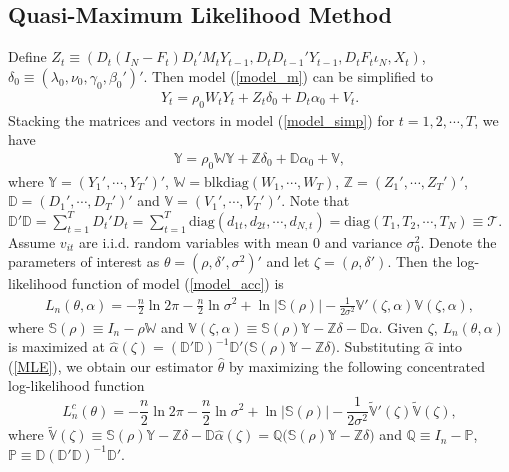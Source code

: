 \documentclass[11pt,a4paper]{article}
\begin{document}
\subsection{Quasi-Maximum Likelihood Method}
Define $Z_t\equiv(D_t(I_N-F_t)D_t'M_tY_{t-1},D_tD_{t-1}'Y_{t-1},D_tF_t\iota_N,X_t)$, $\delta_0\equiv(\lambda_0,\nu_0,\gamma_0,\beta_0')'$.
Then model (\ref{model_m}) can be simplified to
\begin{align}\label{model_simp}
Y_t=\rho_0 W_tY_t+ Z_t\delta_0+D_t\alpha_0+V_t.
\end{align}
Stacking the matrices and vectors in model (\ref{model_simp}) for $t=1,2,\cdots,T$, we have 
\begin{align}\label{model_acc}
\mathbb{Y}=\rho_0\mathbb{W}\mathbb{Y}+\mathbb{Z}\delta_0+\mathbb{D}\alpha_0+\mathbb{V},
\end{align}
where $\mathbb{Y}=(Y_1',\cdots,Y_T')'$, $\mathbb{W}=\mathrm{blkdiag}(W_1,\cdots,W_T)$, $\mathbb{Z}=(Z_1',\cdots,Z_T')'$, $\mathbb{D}=(D_1',\cdots,D_T')'$ and $\mathbb{V}=(V_1',\cdots,V_T')'$.
Note that $\mathbb{D'D}=\sum_{t=1}^TD_t'D_t=\sum_{t=1}^T\mathrm{diag}(d_{1t},d_{2t},\cdots,d_{N,t})=\mathrm{diag}(T_1,T_2,\cdots,T_N)\equiv\mathcal{T}$.
Assume $v_{it}$ are i.i.d. random variables with mean $0$ and variance $\sigma^2_0$. Denote the parameters of interest as $\theta=(\rho,\delta',\sigma^2)'$ and let $\zeta=(\rho,\delta')$. Then the log-likelihood function of model (\ref{model_acc}) is
\begin{align}\label{MLE}
L_n(\theta,\alpha)=-\frac{n}{2}\ln2\pi-\frac{n}{2}\ln\sigma^2+\ln|\mathbb{S}(\rho)|-\frac{1}{2\sigma^2}\mathbb{V}'(\zeta,\alpha)\mathbb{V}(\zeta,\alpha),
\end{align}
where $\mathbb{S}(\rho)\equiv I_{n}-\rho\mathbb{W}$ and $\mathbb{V}(\zeta,\alpha)\equiv\mathbb{S(\rho)Y-Z}\delta-\mathbb{D}\alpha$. Given $\zeta$, $L_n(\theta,\alpha)$ is maximized at
$\hat{\alpha}(\zeta)=\mathbb{(D'D)}^{-1} \mathbb{D'}(\mathbb{S}(\rho)\mathbb{Y-Z\delta)}$.
Substituting $\hat{\alpha}$ into (\ref{MLE}), we obtain our 
estimator $\hat{\theta}$ by maximizing the following concentrated log-likelihood function
\begin{equation}
L_n^c(\theta)=-\frac{n}{2}\ln2\pi-\frac{n}{2}\ln\sigma^2+\ln|\mathbb{S}(\rho)|-\frac{1}{2\sigma^2}\widetilde{\mathbb{V}}'(\zeta)\widetilde{\mathbb{V}}(\zeta),\label{CMLE}
\end{equation}
where $\widetilde{\mathbb{V}}(\zeta)\equiv\mathbb{S}(\rho)\mathbb{Y-Z\delta}-\mathbb{D}\hat{\alpha}(\zeta)=\mathbb{Q(S(\rho)Y-Z\delta})$ and $\mathbb{Q}\equiv I_{n}-\mathbb{P}$, $\mathbb{P}\equiv\mathbb{D}(\mathbb{D}'\mathbb{D})^{-1}\mathbb{D}'$.
\end{document}
